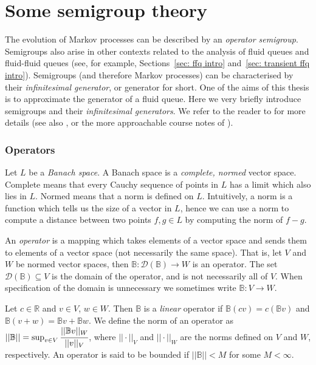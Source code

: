 \section{Some semigroup theory}
The evolution of Markov processes can be described by an \emph{operator semigroup}. Semigroups also arise in other contexts related to the analysis of fluid queues and fluid-fluid queues (see, for example, Sections~\ref{sec: ffq intro} and~\ref{sec: transient ffq intro}). Semigroups (and therefore Markov processes) can be characterised by their \emph{infinitesimal generator}, or generator for short. One of the aims of this thesis is to approximate the generator of a fluid queue. Here we very briefly introduce semigroups and their \emph{infinitesimal generators}. We refer to the reader to \cite{ethierkurtz} for more details (see also \cite{kallenberg}, or the more approachable course notes of \cite{shalizi}). 

\subsubsection{Operators}
Let \(L\) be a \emph{Banach space}. A Banach space is a \emph{complete, normed} vector space. Complete means that every Cauchy sequence of points in \(L\) has a limit which also lies in \(L\). Normed means that a norm is defined on \(L\). Intuitively, a norm is a function which tells us the size of a vector in \(L\), hence we can use a norm to compute a distance between two points \(f,g\in L\) by computing the norm of \(f-g\). 

An \emph{operator} is a mapping which takes elements of a vector space and sends them to elements of a vector space (not necessarily the same space). That is, let \(V\) and \(W\) be normed vector spaces, then \(\mathbb B:\mathcal D(\mathbb B)\to W\) is an operator. The set \(\mathcal D(\mathbb B)\subseteq V\) is the domain of the operator, and is not necessarily all of \(V\). When specification of the domain is unnecessary we sometimes write \(\mathbb B:V\to W\). 

Let \(c\in \mathbb R\) and \(v\in V\), \(w\in W\). Then \(\mathbb B\) is a \emph{linear} operator if \(\mathbb B(cv) = c(\mathbb Bv)\) and \(\mathbb B(v+w)=\mathbb Bv+\mathbb Bw\). We define the norm of an operator as \(||\mathbb B||=\sup_{v\in V}\cfrac{||\mathbb Bv||_W}{||v||_V}\), where \(||\cdot||_V\) and \(||\cdot||_W\) are the norms defined on \(V\) and \(W\), respectively.  An operator is said to be bounded if \(||\mathbb B||<M\) for some \(M<\infty\). 

